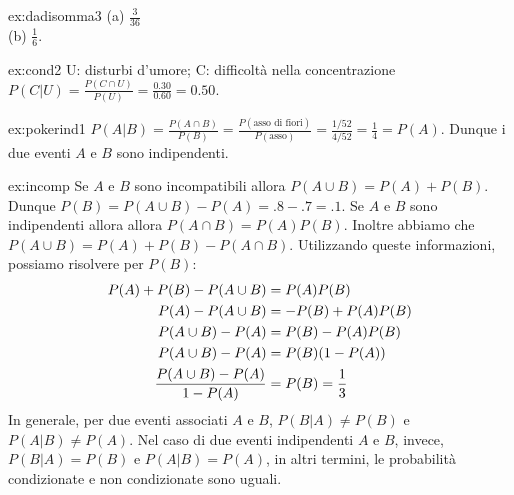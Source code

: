
\begin{sol}{ex:dadisomma3}
(a) $\frac{3}{36}$\\
(b)  $\frac{1}{6}$.
\end{sol}



\begin{sol}{ex:cond2}
U: disturbi d'umore; C: difficoltà nella concentrazione\\
\noindent
$
P(C | U) = \frac{P(C \cap U)}{P(U)} = \frac{0.30}{0.60} = 0.50.
$
\end{sol}


\begin{sol}{ex:pokerind1}
$
P(A | B) = \frac{P(A \cap B)}{P(B)} =  \frac{P(\text{asso di fiori})}{P(\text{asso})} = \frac{1/52}{4/52}= \frac{1}{4} = P(A)
$. Dunque i  due eventi  $A$ e $B$ sono indipendenti.
\end{sol}


\begin{sol}{ex:incomp}
 Se $A$ e $B$ sono incompatibili allora $P(A \cup B) = P(A) + P(B)$.
     Dunque $P(B) =  P(A \cup B) - P(A) = .8 - .7 = .1$.
     Se $A$ e $B$ sono indipendenti allora allora $P(A \cap B) = P(A) P(B)$.
     Inoltre abbiamo che $P(A \cup B) = P(A) + P(B) - P(A \cap  B)$.
    Utilizzando queste informazioni, possiamo risolvere per $P(B)$:
    \begin{align}
    P(A) + P(B) - P(A \cup B) &=  P(A) P(B)\notag\\
    P(A)- P(A \cup B) &=  - P(B) + P(A) P(B)\notag\\
    P(A \cup B) - P(A) &=   P(B) - P(A) P(B)\notag\\
     P(A \cup B) - P(A) &=   P(B) (1 - P(A))\notag\\
     \frac{P(A \cup B) - P(A)}{1 - P(A)} &=   P(B) = \frac{1}{3}\notag
    \end{align}
     In generale, per due eventi associati $A$ e $B$, $P(B|A) \neq
     P(B)$ e $P(A|B) \neq P(A)$.
      Nel caso di due eventi indipendenti $A$ e $B$, invece, $P(B|A)
     = P(B)$ e $P(A|B) = P(A)$, in altri termini, le probabilit{\`a}
     condizionate e non condizionate sono uguali.
\end{sol}

